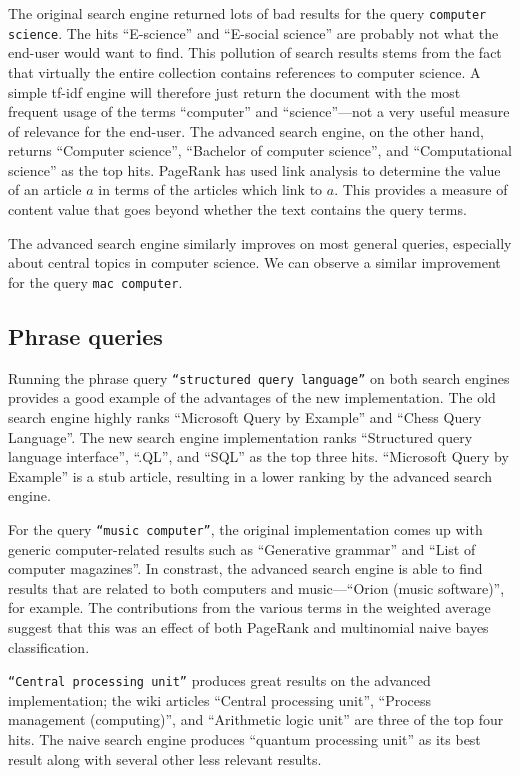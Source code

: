 \documentclass[11pt]{article}
\begin{document}
The original search engine returned lots of bad results for the query \texttt{computer science}. The hits
``E-science'' and ``E-social science'' are probably not what the end-user would want to find. This pollution of search
results stems from the fact that virtually the entire collection contains references to computer science. A simple
tf-idf engine will therefore just return the document with the most frequent usage of the terms ``computer'' and ``science''---not a
very useful measure of relevance for the end-user. The advanced search engine, on the other hand, returns ``Computer science'',
``Bachelor of computer science'', and ``Computational science'' as the top hits. PageRank has used link analysis to
determine the value of an article $a$ in terms of the articles which link to $a$. This provides
a measure of content value that goes beyond whether the text contains the query terms.

The advanced search engine similarly improves on most general queries, especially about central topics in
computer science. We can observe a similar improvement for the query \texttt{mac computer}.

\subsection*{Phrase queries}

Running the phrase query \texttt{``structured query language''} on both search engines provides
a good example of the advantages of the new implementation. The old search engine highly ranks
``Microsoft Query by Example'' and ``Chess Query Language''. The new search
engine implementation ranks ``Structured query language interface'', ``.QL'', and ``SQL'' as the top three hits.
``Microsoft Query by Example'' is a stub article, resulting in a lower ranking by the advanced
search engine.

For the query \texttt{``music computer''}, the original implementation comes up with generic computer-related
results such as ``Generative grammar'' and ``List of computer magazines''. In constrast, the advanced search engine
is able to find results that are related to both computers and music---``Orion (music software)'', for example.
The contributions from the various terms in the weighted average suggest that this was an effect of both
PageRank and multinomial naive bayes classification.

\texttt{``Central processing unit''} produces great results on the advanced implementation; the wiki articles
``Central processing unit'', ``Process management (computing)'', and ``Arithmetic logic unit'' are three of the
top four hits. The naive search engine produces ``quantum processing unit'' as its best result along with
several other less relevant results. 
\end{document}
